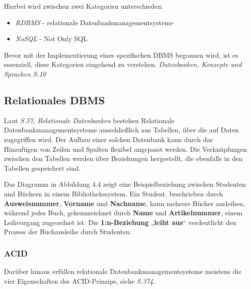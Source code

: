  \vspace{3mm}\noindent Hierbei wird zwischen zwei Kategorien unterschieden:
 
 \begin{itemize}
    \item \textit{RDBMS} - relationale Datenbankmanagementsysteme
    \item \textit{NoSQL} - Not Only \gls{SQL} 
 \end{itemize}
 
\vspace{3mm}\noindent Bevor mit der Implementierung eines spezifischen DBMS begonnen wird, ist es essenziell, diese Kategorien eingehend zu verstehen.
\cite{Buch:GunterSaake} \textit{Datenbanken, Konzepte und Sprachen S.10}

\newpage
\subsection{Relationales DBMS}
Laut \textit{\cite{Buch:EdwinSchicker} S.57, Relationale Datenbanken} bestehen Relationale Datenbankmanagementsysteme ausschließlich aus Tabellen, über die auf Daten zugegriffen wird. Der Aufbau einer solchen Datenbank kann durch das Hinzufügen von Zeilen und Spalten flexibel angepasst werden. Die Verknüpfungen zwischen den Tabellen werden über Beziehungen hergestellt, die ebenfalls in den Tabellen gespeichert sind. \newline 

\vspace{3mm}

\noindent Das Diagramm in Abbildung 4.4 zeigt eine Beispielbeziehung zwischen Studenten und Büchern in einem Bibliothekssystem. Ein Student, beschrieben durch \textbf{Ausweisnummer}, \textbf{Vorname} und \textbf{Nachname}, kann mehrere Bücher ausleihen, während jedes Buch, gekennzeichnet durch \textbf{Name} und \textbf{Artikelnummer}, einem Leihvorgang zugeordnet ist. Die \textbf{1:n-Beziehung} „\textbf{leiht aus}“ verdeutlicht den Prozess der Buchausleihe durch Studenten.


\subsubsection{ACID}

\vspace{3mm}\noindent Darüber hinaus erfüllen relationale Datenbankmanagementsysteme meistens die vier Eigenschaften des ACID-Prinzips, siehe \textit{\cite{Buch:GunterSaake} S.374}.

